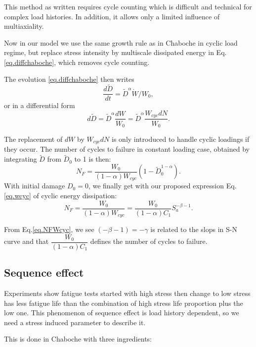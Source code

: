 This method as written requires cycle counting which is difficult and technical for complex load histories. In addition, it allows only a limited influence of multiaxiality.


Now in our model we use the same growth rule as in Chaboche in cyclic load regime, but replace stress intensity by multiscale dissipated energy  in Eq.\eqref{eq.diffchaboche}, which removes cycle counting.

The evolution \eqref{eq.diffchaboche} then writes
$$
\dfrac{d\tilde{D}}{dt} ={\tilde{D}}^\alpha \dot{W}/W_0,
$$
or in a differential form
\begin{equation}
d \tilde{D}=\tilde{D}^\alpha\dfrac{d W}{W_0}=\tilde{D}^\alpha\dfrac{W_{cyc}d N}{W_0}.
\label{eq.DWcyc}
\end{equation}

The replacement of $d W$ by $W_{cyc}dN$ is only introduced to handle cyclic loadings if they occur. The number of cycles to failure in constant loading case, obtained by integrating $\tilde{D}$ from $\tilde{D}_0$ to 1 is then:
$$N_F=\dfrac{W_0}{\left( 1-\alpha\right)W_{cyc} }\left( 1-\tilde{D}_0^{1-\alpha}\right) .$$
With initial damage $D_0=0$, we finally get with our proposed expression Eq.\eqref{eq.wcyc} of cyclic energy dissipation:
\begin{equation}
N_F=\dfrac{W_0}{\left( 1-\alpha\right)W_{cyc} }=\dfrac{W_0}{(1-\alpha)C_1}S_{a}^{-\beta-1}.
\label{eq.NFWcyc}
\end{equation}

From Eq.\eqref{eq.NFWcyc}, we see $(-\beta-1)=-\gamma$ is related to the slops in S-N curve and that $\dfrac{W_0}{(1-\alpha)C_1}$ defines the number of cycles to failure.
\subsection{Sequence effect}

Experiments show fatigue tests started with high stress then change to low stress has less fatigue life than the combination of high stress life proportion plus the low one. This phenomenon of sequence effect is load history dependent, so we need a stress induced parameter to describe it. 

This is done in Chaboche  with three ingredients:

